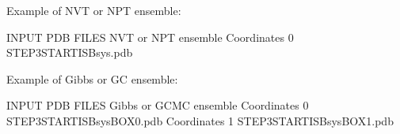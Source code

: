 \documentclass[letterpaper,10pt,english]{sphinxmanual}
\begin{document}
\begin{description}
\sphinxAtStartPar
Example of NVT or NPT ensemble:

\begin{sphinxVerbatim}[commandchars=\\\{\}]
\PYGZsh{}\PYGZsh{}\PYGZsh{}\PYGZsh{}\PYGZsh{}\PYGZsh{}\PYGZsh{}\PYGZsh{}\PYGZsh{}\PYGZsh{}\PYGZsh{}\PYGZsh{}\PYGZsh{}\PYGZsh{}\PYGZsh{}\PYGZsh{}\PYGZsh{}\PYGZsh{}\PYGZsh{}\PYGZsh{}\PYGZsh{}\PYGZsh{}\PYGZsh{}\PYGZsh{}\PYGZsh{}\PYGZsh{}\PYGZsh{}\PYGZsh{}\PYGZsh{}\PYGZsh{}\PYGZsh{}\PYGZsh{}\PYGZsh{}\PYGZsh{}\PYGZsh{}\PYGZsh{}\PYGZsh{}\PYGZsh{}\PYGZsh{}\PYGZsh{}\PYGZsh{}\PYGZsh{}\PYGZsh{}\PYGZsh{}\PYGZsh{}
\PYGZsh{} INPUT PDB FILES \PYGZhy{} NVT or NPT ensemble
\PYGZsh{}\PYGZsh{}\PYGZsh{}\PYGZsh{}\PYGZsh{}\PYGZsh{}\PYGZsh{}\PYGZsh{}\PYGZsh{}\PYGZsh{}\PYGZsh{}\PYGZsh{}\PYGZsh{}\PYGZsh{}\PYGZsh{}\PYGZsh{}\PYGZsh{}\PYGZsh{}\PYGZsh{}\PYGZsh{}\PYGZsh{}\PYGZsh{}\PYGZsh{}\PYGZsh{}\PYGZsh{}\PYGZsh{}\PYGZsh{}\PYGZsh{}\PYGZsh{}\PYGZsh{}\PYGZsh{}\PYGZsh{}\PYGZsh{}\PYGZsh{}\PYGZsh{}\PYGZsh{}\PYGZsh{}\PYGZsh{}\PYGZsh{}\PYGZsh{}\PYGZsh{}\PYGZsh{}\PYGZsh{}\PYGZsh{}\PYGZsh{}
Coordinates   0   STEP3\PYGZus{}START\PYGZus{}ISB\PYGZus{}sys.pdb
\end{sphinxVerbatim}

\sphinxAtStartPar
Example of Gibbs or GC ensemble:

\begin{sphinxVerbatim}[commandchars=\\\{\}]
\PYGZsh{}\PYGZsh{}\PYGZsh{}\PYGZsh{}\PYGZsh{}\PYGZsh{}\PYGZsh{}\PYGZsh{}\PYGZsh{}\PYGZsh{}\PYGZsh{}\PYGZsh{}\PYGZsh{}\PYGZsh{}\PYGZsh{}\PYGZsh{}\PYGZsh{}\PYGZsh{}\PYGZsh{}\PYGZsh{}\PYGZsh{}\PYGZsh{}\PYGZsh{}\PYGZsh{}\PYGZsh{}\PYGZsh{}\PYGZsh{}\PYGZsh{}\PYGZsh{}\PYGZsh{}\PYGZsh{}\PYGZsh{}\PYGZsh{}\PYGZsh{}\PYGZsh{}\PYGZsh{}\PYGZsh{}\PYGZsh{}\PYGZsh{}\PYGZsh{}\PYGZsh{}\PYGZsh{}\PYGZsh{}\PYGZsh{}\PYGZsh{}
\PYGZsh{} INPUT PDB FILES \PYGZhy{} Gibbs or GCMC ensemble
\PYGZsh{}\PYGZsh{}\PYGZsh{}\PYGZsh{}\PYGZsh{}\PYGZsh{}\PYGZsh{}\PYGZsh{}\PYGZsh{}\PYGZsh{}\PYGZsh{}\PYGZsh{}\PYGZsh{}\PYGZsh{}\PYGZsh{}\PYGZsh{}\PYGZsh{}\PYGZsh{}\PYGZsh{}\PYGZsh{}\PYGZsh{}\PYGZsh{}\PYGZsh{}\PYGZsh{}\PYGZsh{}\PYGZsh{}\PYGZsh{}\PYGZsh{}\PYGZsh{}\PYGZsh{}\PYGZsh{}\PYGZsh{}\PYGZsh{}\PYGZsh{}\PYGZsh{}\PYGZsh{}\PYGZsh{}\PYGZsh{}\PYGZsh{}\PYGZsh{}\PYGZsh{}\PYGZsh{}\PYGZsh{}\PYGZsh{}\PYGZsh{}
Coordinates   0   STEP3\PYGZus{}START\PYGZus{}ISB\PYGZus{}sys\PYGZus{}BOX\PYGZus{}0.pdb
Coordinates   1   STEP3\PYGZus{}START\PYGZus{}ISB\PYGZus{}sys\PYGZus{}BOX\PYGZus{}1.pdb
\end{sphinxVerbatim}


\end{description}
\end{document}
